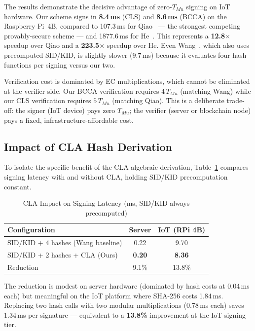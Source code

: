 \documentclass[conference]{IEEEtran}
\begin{document}
The results demonstrate the decisive advantage of zero-$T_{Mu}$ signing
on IoT hardware. Our scheme signs in \textbf{8.4\,ms} (CLS) and
\textbf{8.6\,ms} (BCCA) on the Raspberry Pi~4B, compared to
107.3\,ms for Qiao~\cite{ref24} — the strongest competing
provably-secure scheme — and 1877.6\,ms for He~\cite{ref27}.
This represents a \textbf{12.8$\times$} speedup over Qiao and a
\textbf{223.5$\times$} speedup over He. Even Wang~\cite{ref1},
which also uses precomputed SID/KID, is slightly slower (9.7\,ms)
because it evaluates four hash functions per signing versus our two.

Verification cost is dominated by EC multiplications, which cannot be
eliminated at the verifier side. Our BCCA verification requires
$4\,T_{Mu}$ (matching Wang) while our CLS verification requires
$5\,T_{Mu}$ (matching Qiao). This is a deliberate trade-off: the
signer (IoT device) pays zero $T_{Mu}$; the verifier (server or
blockchain node) pays a fixed, infrastructure-affordable cost.

\subsection{Impact of CLA Hash Derivation}

To isolate the specific benefit of the CLA algebraic derivation,
Table~\ref{tab:cla} compares signing latency with and without CLA,
holding SID/KID precomputation constant.

\begin{table}[htbp]
\centering
\caption{CLA Impact on Signing Latency (ms, SID/KID always precomputed)}
\label{tab:cla}
\renewcommand{\arraystretch}{1.2}
\begin{tabular}{lcc}
\toprule
\textbf{Configuration} & \textbf{Server} & \textbf{IoT (RPi 4B)} \\
\midrule
SID/KID + 4 hashes (Wang baseline) & 0.22 & 9.70 \\
SID/KID + 2 hashes + CLA (Ours)    & \textbf{0.20} & \textbf{8.36} \\
\midrule
Reduction & 9.1\% & 13.8\% \\
\bottomrule
\end{tabular}
\end{table}

The reduction is modest on server hardware (dominated by hash costs at
0.04\,ms each) but meaningful on the IoT platform where SHA-256
costs 1.84\,ms. Replacing two hash calls with two modular
multiplications (0.78\,ms each) saves 1.34\,ms per signature —
equivalent to a \textbf{13.8\%} improvement at the IoT signing tier.
\end{document}
